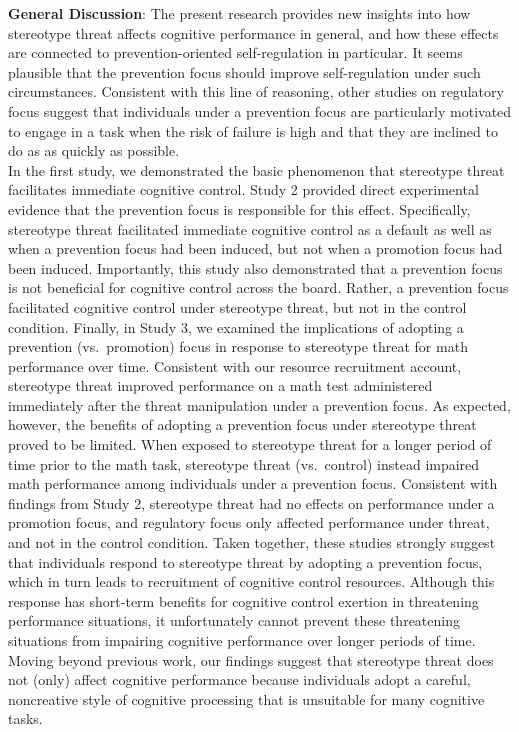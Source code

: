 \documentclass[
  doc, a4paper]{apa7}
\begin{document}
\textbf{General Discussion}:
The present research provides new insights into how stereotype threat affects cognitive performance in general, and how these effects are connected to prevention-oriented self-regulation in particular. It seems plausible that the prevention focus should improve self-regulation under such circumstances. Consistent with this line of reasoning, other studies on regulatory focus suggest that individuals under a prevention focus are particularly motivated to engage in a task when the risk of failure is high and that they are inclined to do as as quickly as possible.\\
In the first study, we demonstrated the basic phenomenon that stereotype threat facilitates immediate cognitive control. Study 2 provided direct experimental evidence that the prevention focus is responsible for this effect. Specifically, stereotype threat facilitated immediate cognitive control as a default as well as when a prevention focus had been induced, but not when a promotion focus had been induced. Importantly, this study also demonstrated that a prevention focus is not beneficial for cognitive control across the board. Rather, a prevention focus facilitated cognitive control under stereotype threat, but not in the control condition. Finally, in Study 3, we examined the implications of adopting a prevention (vs.~promotion) focus in response to stereotype threat for math performance over time. Consistent with our resource recruitment account, stereotype threat improved performance on a math test administered immediately after the threat manipulation under a prevention focus. As expected, however, the benefits of adopting a prevention focus under stereotype threat proved to be limited. When exposed to stereotype threat for a longer period of time prior to the math task, stereotype threat (vs.~control) instead impaired math performance among individuals under a prevention focus. Consistent with findings from Study 2, stereotype threat had no effects on performance under a promotion focus, and regulatory focus only affected performance under threat, and not in the control condition. Taken together, these studies strongly suggest that individuals respond to stereotype threat by adopting a prevention focus, which in turn leads to recruitment of cognitive control resources. Although this response has short-term benefits for cognitive control exertion in threatening performance situations, it unfortunately cannot prevent these threatening situations from impairing cognitive performance over longer periods of time.\\
Moving beyond previous work, our findings suggest that stereotype threat does not (only) affect cognitive performance because individuals adopt a careful, noncreative style of cognitive processing that is unsuitable for many cognitive tasks.
\end{document}
